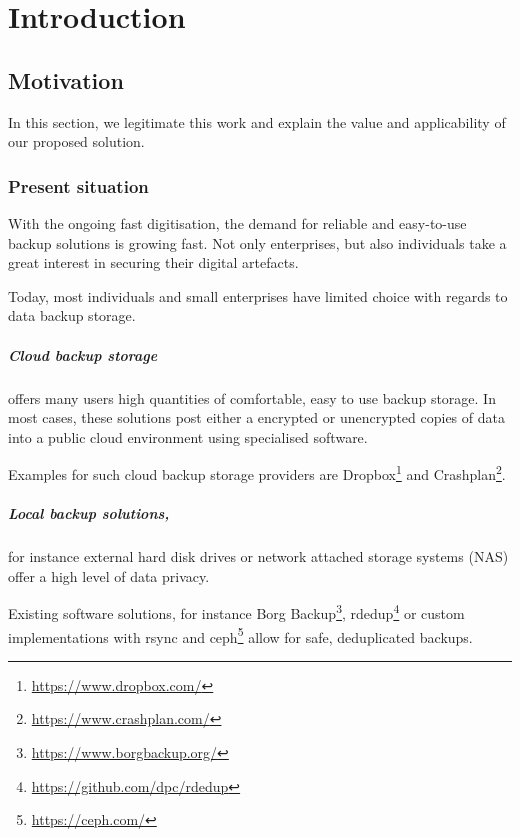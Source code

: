 \chapter{Introduction}
\label{sec:introduction}

\section{Motivation}
In this section, we legitimate this work and explain the value and applicability of our proposed solution.

\subsection{Present situation}
With the ongoing fast digitisation, the demand for reliable and easy-to-use backup solutions is growing fast. Not only enterprises, but also individuals take a great interest in securing their digital artefacts.

Today, most individuals and small enterprises have limited choice with regards to data backup storage.

\paragraph{Cloud backup storage} offers many users high quantities of comfortable, easy to use backup storage. In most cases, these solutions post either a encrypted or unencrypted copies of data into a public cloud environment using specialised software.

Examples for such cloud backup storage providers are Dropbox\footnote{\url{https://www.dropbox.com/}} and Crashplan\footnote{\url{https://www.crashplan.com/}}.

\paragraph{Local backup solutions,} for instance external hard disk drives or network attached storage systems (NAS) offer a high level of data privacy. 

Existing software solutions, for instance Borg Backup\footnote{\url{https://www.borgbackup.org/}}, rdedup\footnote{\url{https://github.com/dpc/rdedup}} or custom implementations with rsync and ceph\footnote{\url{https://ceph.com/}} allow for safe, deduplicated backups.

